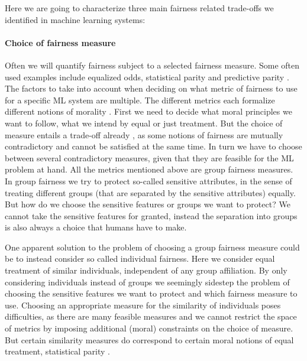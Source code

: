 
	Here we are going to characterize three main fairness related trade-offs we identified in machine learning systems:
	
	\paragraph{Choice of fairness measure}
	Often we will quantify fairness subject to a selected fairness measure.
	Some often used examples include equalized odds, statistical parity and predictive parity \cite{garg2020fairness}.
    The factors to take into account when deciding on what metric of fairness to use for a specific ML system are multiple.
	The different metrics each formalize different notions of morality \cite{binns2020apparent}.
    First we need to decide what moral principles we want to follow, \ie what we intend by equal or just treatment.
	But the choice of measure entails a trade-off already \cite{chouldechova2017fair,kleinberg2016inherent,berk2021fairness}, as some notions of fairness are mutually contradictory and cannot be satisfied at the same time.
	In turn we have to choose between several contradictory measures, given that they are feasible for the ML problem at hand.
	All the metrics mentioned above are group fairness measures.
	In group fairness we try to protect so-called sensitive attributes, in the sense of treating different groups (that are separated by the sensitive attributes) equally.
	But how do we choose the sensitive features or groups we want to protect?
	We cannot take the sensitive features for granted, instead the separation into groups is also always a choice that humans have to make.

	One apparent solution to the problem of choosing a group fairness measure could be to instead consider so called individual fairness.
	Here we consider equal treatment of similar individuals, independent of any group affiliation.
	By only considering individuals instead of groups we seemingly sidestep the problem of choosing the sensitive features we want to protect and which fairness measure to use.
	Choosing an appropriate measure for the similarity of individuals poses difficulties, as there are many feasible measures and we cannot restrict the space of metrics by imposing additional (moral) constraints on the choice of measure.
	But certain similarity measures do correspond to certain moral notions of equal treatment, \eg statistical parity \cite{dwork2012fairness}.

